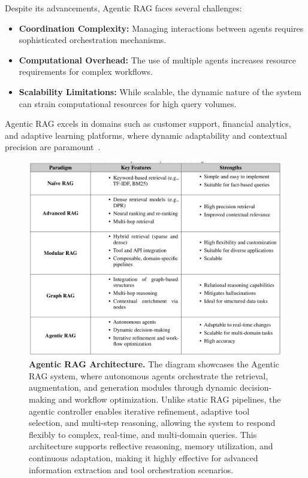 Despite its advancements, Agentic RAG faces several challenges:
\begin{itemize}
  \item \textbf{Coordination Complexity:} Managing interactions between agents requires sophisticated orchestration mechanisms.
  \item \textbf{Computational Overhead:} The use of multiple agents increases resource requirements for complex workflows.
  \item \textbf{Scalability Limitations:} While scalable, the dynamic nature of the system can strain computational resources for high query volumes.
\end{itemize}

Agentic RAG excels in domains such as customer support, financial analytics, and adaptive learning platforms, where dynamic adaptability and contextual precision are paramount~\cite{ferrag2025can}.

\begin{figure}[h!]
    \centering
    \includegraphics[width=0.9\linewidth]{images/fig_7.png}
    \caption{
        \textbf{Agentic RAG Architecture.}
        The diagram showcases the Agentic RAG system, where autonomous agents orchestrate the retrieval, augmentation, and generation modules through dynamic decision-making and workflow optimization. Unlike static RAG pipelines, the agentic controller enables iterative refinement, adaptive tool selection, and multi-step reasoning, allowing the system to respond flexibly to complex, real-time, and multi-domain queries. This architecture supports reflective reasoning, memory utilization, and continuous adaptation, making it highly effective for advanced information extraction and tool orchestration scenarios.
    }
    \label{fig:agentic_rag}
\end{figure}


